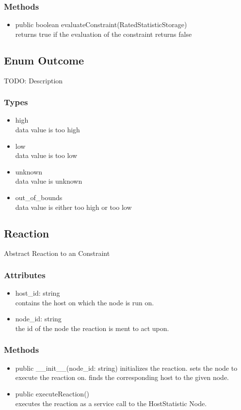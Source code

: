\subsubsection{Methods}
\begin{itemize}
	\item public boolean evaluateConstraint(RatedStatisticStorage)\\
	returns true if the evaluation of the constraint returns false
\end{itemize}

\subsection{Enum Outcome }
TODO: Description

\subsubsection{Types}
\begin{itemize}
	\item high\\
	data value is too high
	\item low\\
	data value is too low
	\item unknown\\
	data value is unknown
	\item out\_of\_bounds\\
	data value is either too high or too low
\end{itemize}


\subsection{Reaction}
	Abstract Reaction to an Constraint
\subsubsection{Attributes}
\begin{itemize}
	\item host\_id: string \\
		contains the host on which the node is run on.
	\item node\_id: string \\
		the id of the node the reaction is ment to act upon. 
\end{itemize}
\subsubsection{Methods}
\begin{itemize}
	\item public \_\_init\_\_(node\_id: string)
		initializes the reaction. sets the node to execute the reaction on. finds the corresponding host to the given node.
	\item public executeReaction()\\
		executes the reaction as a service call to the HostStatistic Node.
\end{itemize}


